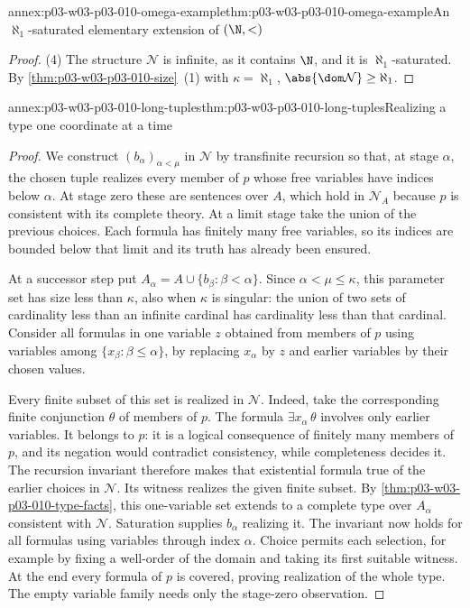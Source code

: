 \begin{annexitem}{annex:p03-w03-p03-010-omega-example}{thm:p03-w03-p03-010-omega-example}{An \(\aleph_1\)-saturated elementary extension of \((\N,<)\)}
\begin{proof}
(4) The structure \(\mathcal N\) is infinite, as it contains \(\N\), and it
is \(\aleph_1\)-saturated.  By \cref{thm:p03-w03-p03-010-size}~(1) with
\(\kappa=\aleph_1\), \(\abs{\dom\mathcal N}\geq\aleph_1\).
\end{proof}
\end{annexitem}

\begin{annexitem}{annex:p03-w03-p03-010-long-tuples}{thm:p03-w03-p03-010-long-tuples}{Realizing a type one coordinate at a time}
\begin{proof}
We construct \((b_\alpha)_{\alpha<\mu}\) in \(\mathcal N\) by
transfinite recursion so that, at stage \(\alpha\), the chosen tuple
realizes every member of \(p\) whose free variables have indices below
\(\alpha\). At stage zero these are sentences over \(A\), which hold
in \(\mathcal N_A\) because \(p\) is consistent with its complete
theory. At a limit stage take the union of the previous choices. Each
formula has finitely many free variables, so its indices are bounded
below that limit and its truth has already been ensured.

At a successor step put
\(A_\alpha=A\cup\{b_\beta:\beta<\alpha\}\). Since
\(\alpha<\mu\leq\kappa\), this parameter set has size less than
\(\kappa\), also when \(\kappa\) is singular: the union of two sets
of cardinality less than an infinite cardinal has cardinality less than
that cardinal. Consider all formulas in one variable \(z\) obtained
from members of \(p\) using variables among
\(\{x_\beta:\beta\leq\alpha\}\), by replacing \(x_\alpha\) by
\(z\) and earlier variables by their chosen values.

Every finite subset of this set is realized in \(\mathcal N\).
Indeed, take the corresponding finite conjunction \(\theta\) of
members of \(p\). The formula \(\exists x_\alpha\,\theta\) involves
only earlier variables. It belongs to \(p\): it is a logical consequence
of finitely many members of \(p\), and its negation would contradict
consistency, while completeness decides it. The recursion invariant
therefore makes that existential formula true of the earlier choices in
\(\mathcal N\). Its witness realizes the given finite subset.
By \cref{thm:p03-w03-p03-010-type-facts}, this one-variable set extends
to a complete type over \(A_\alpha\) consistent with \(\mathcal N\).
Saturation supplies \(b_\alpha\) realizing it. The invariant now holds
for all formulas using variables through index \(\alpha\).
Choice permits each selection, for example by fixing a well-order of
the domain and taking its first suitable witness. At the end every
formula of \(p\) is covered, proving realization of the whole type.
The empty variable family needs only the stage-zero observation.


\end{proof}
\end{annexitem}
